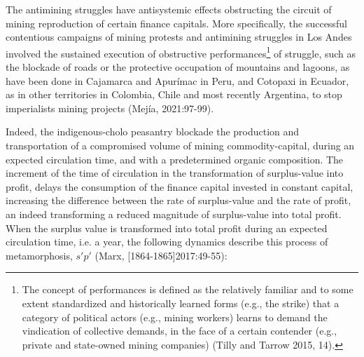 \documentclass[]{interact}
\theoremstyle{plain}%
\theoremstyle{definition}
\theoremstyle{remark}
\begin{document}
The antimining struggles have antisystemic effects obstructing the circuit of mining reproduction of certain finance capitals. More specifically, the successful contentious campaigns of mining protests and antimining struggles in Los Andes involved the sustained execution of obstructive performances\footnote{The concept of performances is defined as the relatively familiar and to some extent standardized and historically learned forms (e.g., the strike) that a category of political actors (e.g., mining workers) learns to demand the vindication of collective demands, in the face of a certain contender (e.g., private and state-owned mining companies) (Tilly and Tarrow 2015, 14).} of struggle, such as the blockade of roads or the protective occupation of mountains and lagoons, as have been done in Cajamarca and Apurímac in Peru, and  Cotopaxi in Ecuador, as in other territories in  Colombia, Chile and most recently Argentina, to stop imperialists mining projects (Mejía, 2021:97-99).

Indeed, the indigenous-cholo peasantry blockade the production and transportation of a compromised volume of mining commodity-capital, during an expected circulation time, and with a predetermined organic composition. The increment of the time of circulation in the transformation of surplus-value into profit, delays the consumption of the finance capital invested in constant capital, increasing the difference between the rate of surplus-value and the rate of profit, an indeed transforming a reduced magnitude of surplus-value into total profit. 
When the surplus value is transformed into total profit during an expected circulation time, i.e. a year, the following dynamics describe this process of metamorphosis, 
\(s'\)\(p'\) (Marx, [1864-1865]2017:49-55): 
\end{document}

